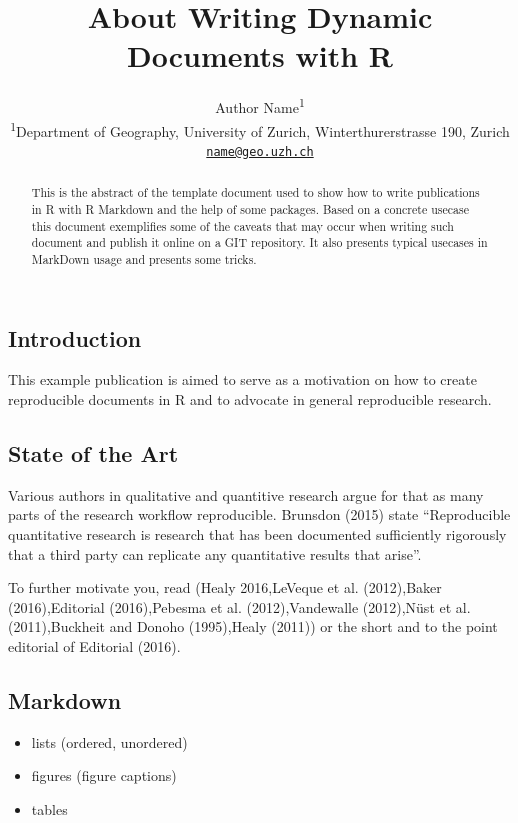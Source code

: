 \documentclass[]{article}
\title{About Writing Dynamic Documents with R}
\author{Author Name\textsuperscript{1} \\ \textsuperscript{1}Department of Geography, University of Zurich,
Winterthurerstrasse 190, Zurich \\ \href{mailto:name@geo.uzh.ch}{\nolinkurl{name@geo.uzh.ch}}}
\date{}
\providecommand{\tightlist}{%
  \setlength{\itemsep}{0pt}\setlength{\parskip}{0pt}}
\begin{document}
\maketitle
\begin{abstract}
This is the abstract of the template document used to show how to write
publications in R with R Markdown and the help of some packages. Based
on a concrete usecase this document exemplifies some of the caveats that
may occur when writing such document and publish it online on a GIT
repository. It also presents typical usecases in MarkDown usage and
presents some tricks.
\end{abstract}

\subsection{Introduction}\label{introduction}

This example publication is aimed to serve as a motivation on how to
create reproducible documents in R and to advocate in general
reproducible research.

\subsection{State of the Art}\label{state-of-the-art}

Various authors in qualitative and quantitive research argue for that as
many parts of the research workflow reproducible. Brunsdon (2015) state
``Reproducible quantitative research is research that has been
documented sufficiently rigorously that a third party can replicate any
quantitative results that arise''.

To further motivate you, read (Healy 2016,LeVeque et al. (2012),Baker
(2016),Editorial (2016),Pebesma et al. (2012),Vandewalle (2012),Nüst et
al. (2011),Buckheit and Donoho (1995),Healy (2011)) or the short and to
the point editorial of Editorial (2016).

\subsection{Markdown}\label{markdown}

\begin{itemize}
\tightlist
\item
  lists (ordered, unordered)
\item
  figures (figure captions)
\item
  tables
\end{itemize}
\end{document}
